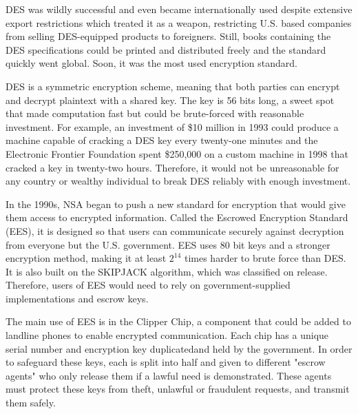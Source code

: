 \documentclass[12pt]{turabian-researchpaper}
\begin{document}
DES was wildly successful and even became internationally used despite extensive export restrictions which treated it as a weapon, restricting U.S. based companies from selling DES-equipped products to foreigners.
Still, books containing the DES specifications could be printed and distributed freely and the standard quickly went global.
Soon, it was the most used encryption standard.

DES is a symmetric encryption scheme, meaning that both parties can encrypt and decrypt plaintext with a shared key.
The key is 56 bits long, a sweet spot that made computation fast but could be brute-forced with reasonable investment.
For example, an investment of \$10 million in 1993 could produce a machine capable of cracking a DES key every twenty-one minutes
  and the Electronic Frontier Foundation spent \$250,000 on a custom machine in 1998 that cracked a key in twenty-two hours.
Therefore, it would not be unreasonable for any country or wealthy individual to break DES reliably with enough investment.

In the 1990s, NSA began to push a new standard for encryption that would give them access to encrypted information.
Called the Escrowed Encryption Standard (EES), it is designed so that users can communicate securely against decryption from everyone but the U.S. government.
EES uses 80 bit keys and a stronger encryption method, making it at least $2^{14}$ times harder to brute force than DES.
It is also built on the SKIPJACK algorithm, which was classified on release. Therefore, users of EES would need to rely on government-supplied implementations and escrow keys.

The main use of EES is in the Clipper Chip, a component that could be added to landline phones to enable encrypted communication.
Each chip has a unique serial number and encryption key duplicatedand held by the government.
In order to safeguard these keys, each is split into half and given to different "escrow agents" who only release them if a lawful need is demonstrated.
These agents must protect these keys from theft, unlawful or fraudulent requests, and transmit them safely.
\end{document}
